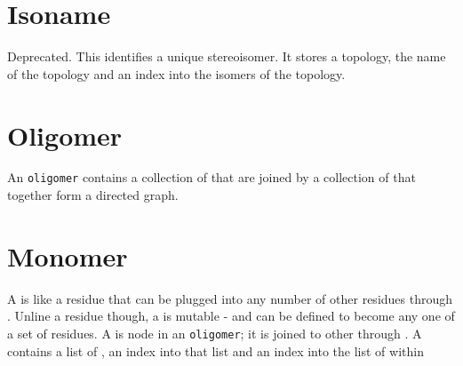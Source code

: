 \section{Isoname}

Deprecated.
This identifies a unique stereoisomer. It stores a topology, the name of the topology and an index into the isomers of the topology.

\section{Oligomer}

An \texttt{oligomer} contains a collection of {\monomers} that are joined by a collection of {\couplings} that together form a directed graph.

\section{Monomer}

A {\monomer} is like a residue that can be plugged into any number of other residues through {\couplings}. Unline a residue though, a {\monomer} is mutable - and can be defined to become any one of a set of residues.
A {\monomer} is node in an \texttt{oligomer}; it is joined to other {\monomer} through {\couplings}. A {\monomer} contains a list of {\topologys}, an index into that list and an index into the list of {\stereoisomerAtoms} within 
